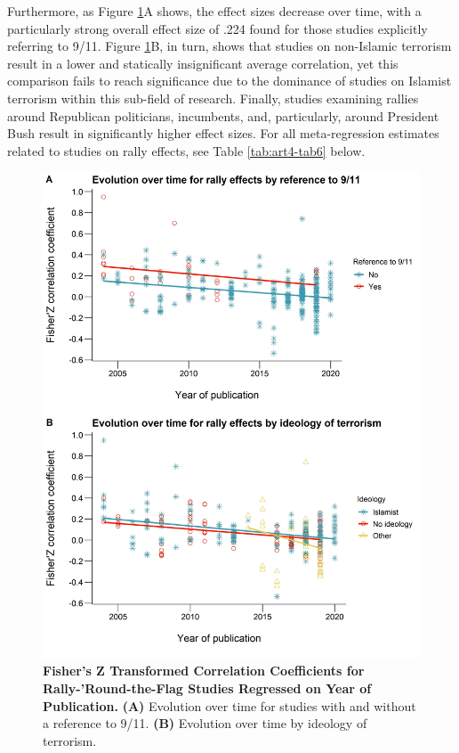 Furthermore, as Figure \ref{fig:art4-fig3}A shows, the effect sizes decrease over time, with a particularly strong overall effect size of .224 found for those studies explicitly referring to 9/11. Figure \ref{fig:art4-fig3}B, in turn, shows that studies on non-Islamic terrorism result in a lower and statically insignificant average correlation, yet this comparison fails to reach significance due to the dominance of studies on Islamist terrorism within this sub-field of research. Finally, studies examining rallies around Republican politicians, incumbents, and, particularly, around President Bush result in significantly higher effect sizes. For all meta-regression estimates related to studies on rally effects, see Table \ref{tab:art4-tab6} below.

\newpage

\begin{figure}[H]
\centering
\includegraphics[width=\textwidth]{Chapter_5/art4-figure3.jpeg}
\caption[Fisher’s Z Transformed Correlation Coefficients for Rally-'Round-the-Flag Studies Regressed on Year of Publication]{\textbf{Fisher’s Z Transformed Correlation Coefficients for Rally-'Round-the-Flag Studies Regressed on Year of Publication.} \textbf{(A)} Evolution over time for studies with and without a reference to 9/11. \textbf{(B)} Evolution over time by ideology of terrorism.}
\label{fig:art4-fig3}
\end{figure}

